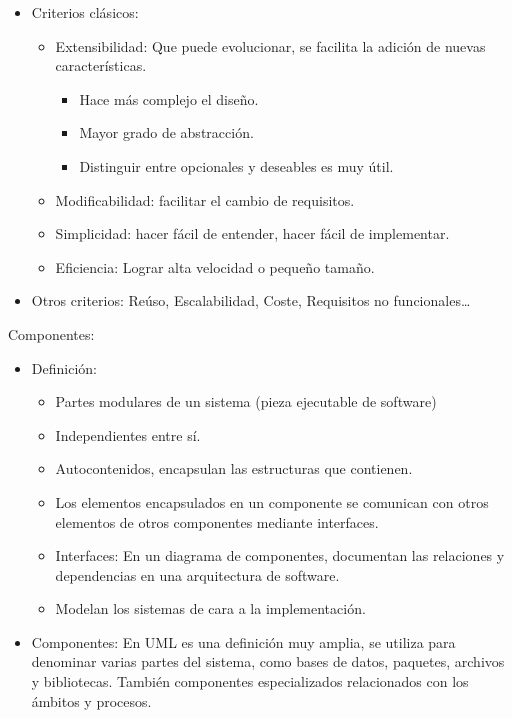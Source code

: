 \documentclass[12pt, twoside, openright]{report} %
\begin{document}
\begin{itemize}
	\item Criterios clásicos:
		\begin{itemize}
			\item Extensibilidad: Que puede evolucionar, se facilita la adición de
			nuevas características.
				\begin{itemize}
					\item Hace más complejo el diseño.
					\item Mayor grado de abstracción.
					\item Distinguir entre opcionales y deseables es muy útil.
				\end{itemize}
			\item Modificabilidad: facilitar el cambio de requisitos.
			\item Simplicidad: hacer fácil de entender, hacer fácil de
			implementar.
			\item Eficiencia: Lograr alta velocidad o pequeño tamaño.
		\end{itemize}
	\item Otros criterios: Reúso, Escalabilidad, Coste, Requisitos no
		funcionales\ldots{}
\end{itemize}
\pagebreak
Componentes:
\begin{itemize} 
    \item Definición:
		\begin{itemize}
			\item Partes modulares de un sistema (pieza ejecutable de software)
			\item Independientes entre sí.
			\item Autocontenidos, encapsulan las estructuras que contienen.
			\item Los elementos encapsulados en un componente se comunican con
				otros elementos de otros componentes mediante interfaces.
			\item Interfaces: En un diagrama de componentes, documentan las
				relaciones y dependencias en una arquitectura de software.
			\item Modelan los sistemas de cara a la implementación.
      	\end{itemize}
    \item Componentes: En UML es una definición muy amplia, se utiliza para
      denominar varias partes del sistema, como bases de datos,
      paquetes, archivos y bibliotecas. También componentes
      especializados relacionados con los ámbitos y procesos.
\end{itemize}
\end{document}
